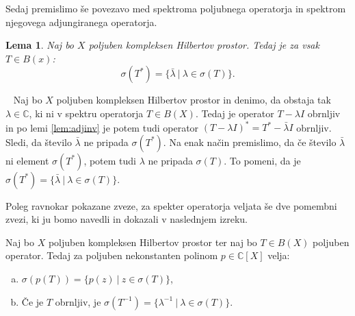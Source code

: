 \documentclass[12pt,a4paper,oneside,fleqn,openany]{book}
\newtheorem{lema}[izrek]{Lema}
\newcommand{\eopf}{\raisebox{0.8ex}{\framebox{}}} %
\newenvironment{dokaz}%
{\noindent{\bf Dokaz.}\ }%
{\hfill\eopf\par\bigskip}%
\newcommand{\C}{\mathbb{C}}
\begin{document}
Sedaj premislimo še povezavo med spektroma poljubnega operatorja in spektrom njegovega adjungiranega operatorja.

\begin{lema}
	\label{lem:adjspec}
	Naj bo $X$ poljuben kompleksen Hilbertov prostor. Tedaj je za vsak $T\in B(x)$: $$\sigma(T^*)=\{\bar{\lambda}~|~\lambda\in\sigma(T)\}.$$
\end{lema}

\begin{dokaz}
	Naj bo $X$ poljuben kompleksen Hilbertov prostor in denimo, da obstaja tak $\lambda\in\C$, ki ni v spektru operatorja $T\in B(X)$. Tedaj je operator $T-\lambda I$ obrnljiv in po lemi \ref{lem:adjinv} je potem tudi operator $(T-\lambda I)^* = T^* - \bar{\lambda}I$ obrnljiv. Sledi, da število $\bar{\lambda}$ ne pripada $\sigma(T^*)$. Na enak način premislimo, da če število $\bar{\lambda}$ ni element $\sigma(T^*)$, potem tudi $\lambda$ ne pripada $\sigma(T)$. To pomeni, da je $\sigma(T^*) =\{\bar{\lambda}~|~\lambda\in\sigma(T)\}$.
\end{dokaz}
Poleg ravnokar pokazane zveze, za spekter operatorja veljata še dve pomembni zvezi, ki ju bomo navedli in dokazali v naslednjem izreku.
\begin{izrek}
	\label{izr:polyspec}
	Naj bo $X$ poljuben kompleksen Hilbertov prostor ter naj bo $T\in B(X)$ poljuben operator. Tedaj za poljuben nekonstanten polinom $p\in\C[X]$ velja: \begin{enumerate}[a)]
		\item $\sigma(p(T))=\{p(z)~|~z\in\sigma(T)\}$,
		\item Če je $T$ obrnljiv, je $\sigma(T^{-1})=\{\lambda^{-1}~|~\lambda\in\sigma(T)\}$.
	\end{enumerate}
\end{izrek}
\end{document}
